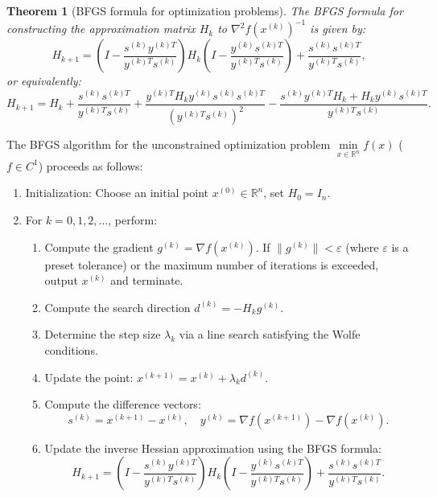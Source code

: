 \documentclass[a4paper,fleqn,numbers]{cas-sc}
\newtheorem{theorem}{Theorem}[section]
\begin{document}
	
	\begin{theorem}[BFGS formula for optimization problems] 
		The BFGS formula for constructing the approximation matrix $H_k$ to $\nabla^2 f(x^{(k)})^{-1}$ is given by:
		\[
		H_{k+1} = \left(I - \frac{s^{(k)} y^{(k)T}}{y^{(k)T} s^{(k)}} \right) H_k \left(I - \frac{y^{(k)} s^{(k)T}}{y^{(k)T} s^{(k)}} \right) + \frac{s^{(k)} s^{(k)T}}{y^{(k)T} s^{(k)}},
		\]
		or equivalently:
		\[
		H_{k+1} = H_k +\frac{s^{(k)} s^{(k)T}}{y^{(k)T} s^{(k)}} +  \frac{y^{(k)T} H_k y^{(k)} s^{(k)} s^{(k)T}}{(y^{(k)T} s^{(k)})^2} - \frac{s^{(k)} y^{(k)T} H_k + H_k y^{(k)} s^{(k)T}}{y^{(k)T} s^{(k)}}.
		\]
	\end{theorem}
	
	The BFGS algorithm for the unconstrained optimization problem $\min\limits_{x \in \mathbb{R}^n} f(x)$ ($f\in C^1$) proceeds as follows:
	
	\begin{enumerate}
		\item Initialization: Choose an initial point $x^{(0)} \in \mathbb{R}^n$, set $H_0 = I_{n}$.
		\item For $k = 0,1,2,\ldots$, perform:
		\begin{enumerate}
			\item Compute the gradient $g^{(k)} = \nabla f(x^{(k)})$. If $\|g^{(k)}\| < \varepsilon$ (where $\varepsilon$ is a preset tolerance) or the maximum number of iterations is exceeded, output $x^{(k)}$ and terminate.
			\item Compute the search direction $d^{(k)} = -H_k g^{(k)}$.
			\item Determine the step size $\lambda_k$ via a line search satisfying the Wolfe conditions.
			\item Update the point: $x^{(k+1)} = x^{(k)} + \lambda_k d^{(k)}$.
			\item Compute the difference vectors:
			\[
			s^{(k)} = x^{(k+1)} - x^{(k)}, \quad
			y^{(k)} = \nabla f(x^{(k+1)}) - \nabla f(x^{(k)}).
			\]
			\item Update the inverse Hessian approximation using the BFGS formula:
			\[
			H_{k+1} = \left(I - \frac{s^{(k)} y^{(k)T}}{y^{(k)T} s^{(k)}} \right) H_k \left(I - \frac{y^{(k)} s^{(k)T}}{y^{(k)T} s^{(k)}} \right) + \frac{s^{(k)} s^{(k)T}}{y^{(k)T} s^{(k)}}.
			\]
		\end{enumerate}
	\end{enumerate}
	
\end{document}
